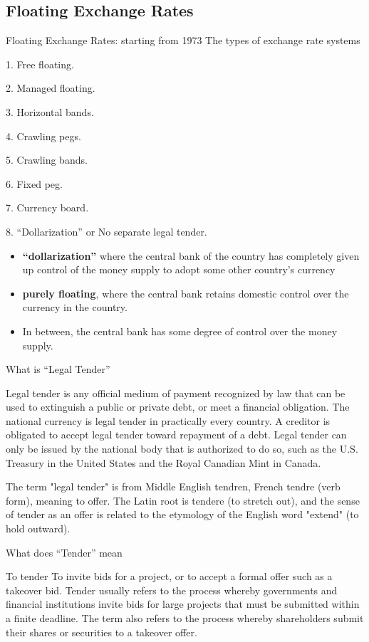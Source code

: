 \documentclass[international_finance_p1.tex]{subfiles}
\begin{document}
\subsection{Floating Exchange Rates}
\begin{frame}{Floating Exchange Rates: starting from 1973}
The types of exchange rate systems

1. Free floating. 

2. Managed floating.

3. Horizontal bands.

4. Crawling pegs. 

5. Crawling bands.

6. Fixed peg. 

7. Currency board. 

8. ``Dollarization'' or No separate legal tender.
\end{frame}
\begin{frame}{}
\begin{itemize}[<+->]
\item
\textbf{“dollarization” }where the central bank of the country has completely given up control of the money supply to adopt some other country’s currency
\item
\textbf{purely floating}, where the central bank retains domestic control over the currency in the country. 
\item
In between, the central bank has some degree of control over the money supply.
\end{itemize}
\end{frame}
\begin{frame}{What is ``Legal Tender''}
\begin{block}{Legal tender }
\quad is any official medium of payment recognized by law that can be used to extinguish a public or private debt, or meet a financial obligation. The national currency is legal tender in practically every country. A creditor is obligated to accept legal tender toward repayment of a debt. Legal tender can only be issued by the national body that is authorized to do so, such as the U.S. Treasury in the United States and the Royal Canadian Mint in Canada.
\end{block}
The term "legal tender" is from Middle English tendren, French tendre (verb form), meaning to offer. The Latin root is tendere (to stretch out), and the sense of tender as an offer is related to the etymology of the English word "extend" (to hold outward).
\end{frame}
\begin{frame}{What does ``Tender'' mean}
\begin{block}{To tender}
To invite bids for a project, or to accept a formal offer such as a takeover bid. Tender usually refers to the process whereby governments and financial institutions invite bids for large projects that must be submitted within a finite deadline. The term also refers to the process whereby shareholders submit their shares or securities to a takeover offer.
\end{block}
\end{frame}
\end{document}
